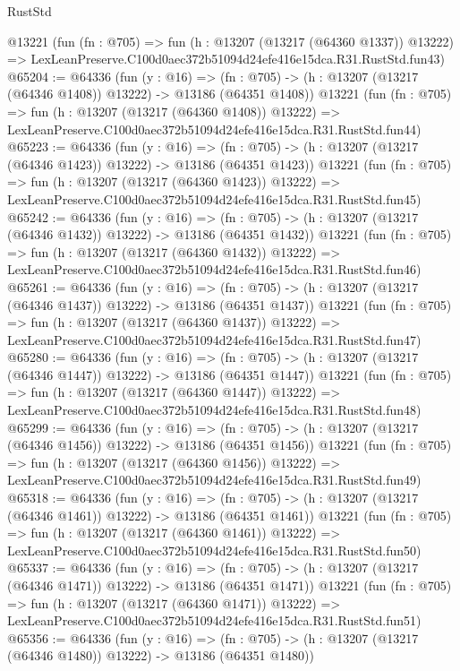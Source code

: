 \begin{lexlean}{RustStd}
\begin{coremodule}
    @13221
    (fun (fn : @705) =>
    fun (h : @13207 (@13217 (@64360 @1337)) @13222) =>
    LexLeanPreserve.C100d0aec372b51094d24efe416e15dca.R31.RustStd.fun43)
@65204 := @64336
    (fun (y : @16) =>
    (fn : @705) -> (h : @13207 (@13217 (@64346 @1408)) @13222) -> @13186 (@64351 @1408))
    @13221
    (fun (fn : @705) =>
    fun (h : @13207 (@13217 (@64360 @1408)) @13222) =>
    LexLeanPreserve.C100d0aec372b51094d24efe416e15dca.R31.RustStd.fun44)
@65223 := @64336
    (fun (y : @16) =>
    (fn : @705) -> (h : @13207 (@13217 (@64346 @1423)) @13222) -> @13186 (@64351 @1423))
    @13221
    (fun (fn : @705) =>
    fun (h : @13207 (@13217 (@64360 @1423)) @13222) =>
    LexLeanPreserve.C100d0aec372b51094d24efe416e15dca.R31.RustStd.fun45)
@65242 := @64336
    (fun (y : @16) =>
    (fn : @705) -> (h : @13207 (@13217 (@64346 @1432)) @13222) -> @13186 (@64351 @1432))
    @13221
    (fun (fn : @705) =>
    fun (h : @13207 (@13217 (@64360 @1432)) @13222) =>
    LexLeanPreserve.C100d0aec372b51094d24efe416e15dca.R31.RustStd.fun46)
@65261 := @64336
    (fun (y : @16) =>
    (fn : @705) -> (h : @13207 (@13217 (@64346 @1437)) @13222) -> @13186 (@64351 @1437))
    @13221
    (fun (fn : @705) =>
    fun (h : @13207 (@13217 (@64360 @1437)) @13222) =>
    LexLeanPreserve.C100d0aec372b51094d24efe416e15dca.R31.RustStd.fun47)
@65280 := @64336
    (fun (y : @16) =>
    (fn : @705) -> (h : @13207 (@13217 (@64346 @1447)) @13222) -> @13186 (@64351 @1447))
    @13221
    (fun (fn : @705) =>
    fun (h : @13207 (@13217 (@64360 @1447)) @13222) =>
    LexLeanPreserve.C100d0aec372b51094d24efe416e15dca.R31.RustStd.fun48)
@65299 := @64336
    (fun (y : @16) =>
    (fn : @705) -> (h : @13207 (@13217 (@64346 @1456)) @13222) -> @13186 (@64351 @1456))
    @13221
    (fun (fn : @705) =>
    fun (h : @13207 (@13217 (@64360 @1456)) @13222) =>
    LexLeanPreserve.C100d0aec372b51094d24efe416e15dca.R31.RustStd.fun49)
@65318 := @64336
    (fun (y : @16) =>
    (fn : @705) -> (h : @13207 (@13217 (@64346 @1461)) @13222) -> @13186 (@64351 @1461))
    @13221
    (fun (fn : @705) =>
    fun (h : @13207 (@13217 (@64360 @1461)) @13222) =>
    LexLeanPreserve.C100d0aec372b51094d24efe416e15dca.R31.RustStd.fun50)
@65337 := @64336
    (fun (y : @16) =>
    (fn : @705) -> (h : @13207 (@13217 (@64346 @1471)) @13222) -> @13186 (@64351 @1471))
    @13221
    (fun (fn : @705) =>
    fun (h : @13207 (@13217 (@64360 @1471)) @13222) =>
    LexLeanPreserve.C100d0aec372b51094d24efe416e15dca.R31.RustStd.fun51)
@65356 := @64336
    (fun (y : @16) =>
    (fn : @705) -> (h : @13207 (@13217 (@64346 @1480)) @13222) -> @13186 (@64351 @1480))

\end{coremodule}
\end{lexlean}
